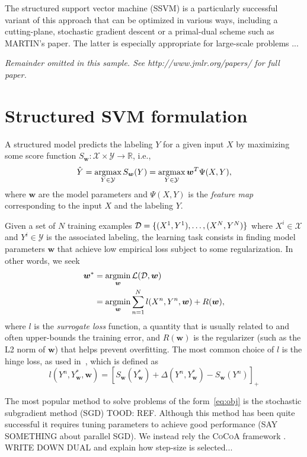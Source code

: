 \documentclass[twoside,11pt]{article}
\newcommand{\cocoa}{\textsc{CoCoA}\xspace}
\newcommand{\dataset}{{\cal D}}
\newcommand{\argmax}{\operatornamewithlimits{argmax}}
\newcommand{\argmin}{\operatornamewithlimits{argmin}}
\newcommand{\0}{\mathbf{0}} %
\newcommand{\weight}{w}
\newcommand{\wv}{{\bm{\weight}}}
\begin{document}
The structured support vector machine (SSVM) is a particularly successful variant of this approach that can be optimized in various ways, including a cutting-plane, stochastic gradient descent or a primal-dual scheme such as MARTIN's paper. The latter is especially appropriate for large-scale problems ...

{\noindent \em Remainder omitted in this sample. See http://www.jmlr.org/papers/ for full paper.}

\section{Structured SVM formulation}

A structured model predicts the labeling $Y$ for a given input $X$ by maximizing some score function
$S_\mathbf{w}:\mathcal{X} \times \mathcal{Y} \rightarrow \mathbb{R}$,
i.e.,
%
\begin{equation}
\label{eq:inference}
\hat{Y} = \argmax_{Y \in \mathcal{Y}} S_\wv(Y) = \argmax_{Y \in \mathcal{Y}} \wv^T\Psi(X,Y),
\end{equation}
%
where $\wv$ are the model parameters and $\Psi(X,Y)$ is the \emph{feature map} corresponding to the input $X$ and the labeling $Y$.


Given a set of $N$ training examples $\dataset=\{(X^1,Y^1), \dots, (X^N,Y^N)\}$ where $X^i \in \mathcal{X}$ and $Y^i \in \mathcal{Y}$ is the associated labeling, 
the learning task consists in finding model parameters $\mathbf{w}$ that
achieve low empirical loss subject to some regularization. In other words, we seek
%
\begin{align}
\label{eq:obj}
\nonumber
\wv^* &= \argmin_\wv \mathcal{L}(\dataset, \wv) \\
& = \argmin_{\wv} \sum_{n=1}^N l(X^n, Y^n, \wv) + R(\wv),
\end{align}
%
where $l$ is the \emph{surrogate loss} function,
a quantity that is usually related to and often upper-bounds the training error, 
and $R(\mathbf{w})$ is the regularizer (such as the L2 norm of $\mathbf{w}$)
that helps prevent overfitting. 
The most common choice of $l$ is the hinge loss, as used in~\cite{Taskar:2003tt,Tsochantaridis:2005ww}, which is defined as
\begin{equation}
\label{eq:hinge-loss}
l(Y^n, Y^*_\mathbf{w}, \wv) = [S_\mathbf{w}(Y^*_\wv) + \Delta(Y^n,Y^*_\wv) - S_\wv(Y^n)]_+
\end{equation}


The most popular method to solve problems of the form~\eqref{eq:obj} is the stochastic subgradient method (SGD) TOOD: REF. Although this method has been quite successful it requires tuning parameters to achieve good performance (SAY SOMETHING about parallel SGD). We instead rely the \cocoa framework \citep{Jaggi:2014vi}. WRITE DOWN DUAL and explain how step-size is selected...
\end{document}
